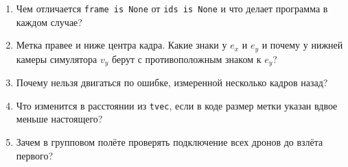 \begin{questionbox}
\begin{enumerate}
    \item Чем отличается \verb|frame is None| от \verb|ids is None| и что делает программа в каждом случае?
    \item Метка правее и ниже центра кадра. Какие знаки у $e_x$ и $e_y$ и почему у нижней камеры симулятора $v_y$ берут с противоположным знаком к $e_y$?
    \item Почему нельзя двигаться по ошибке, измеренной несколько кадров назад?
    \item Что изменится в расстоянии из \verb|tvec|, если в коде размер метки указан вдвое меньше настоящего?
    \item Зачем в групповом полёте проверять подключение всех дронов до взлёта первого?
\end{enumerate}
\end{questionbox}
